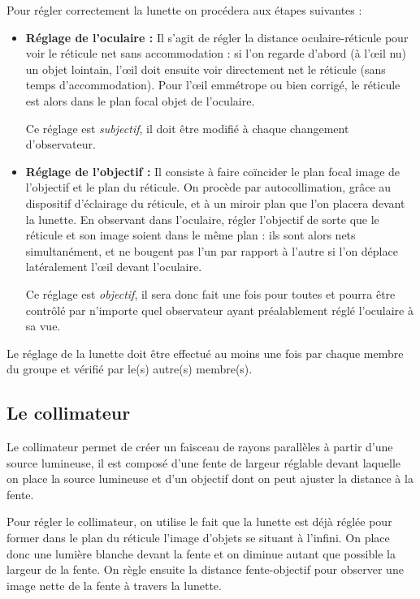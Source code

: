 \documentclass{tp}
\begin{document}
Pour régler correctement la lunette on procédera aux étapes suivantes :
\begin{itemize}
  \item \textbf{Réglage de l’oculaire : } Il s’agit de régler la distance oculaire-réticule pour voir le réticule net sans accommodation : si l’on regarde d’abord (à l’\oe{}il nu) un objet lointain, l’\oe{}il doit ensuite voir directement net le réticule (sans temps d’accommodation). Pour l’\oe{}il emmétrope ou bien corrigé, le réticule est alors dans le plan focal objet de l’oculaire.

Ce réglage est \emph{subjectif}, il doit être modifié à chaque changement d’observateur.

\item \textbf{Réglage de l’objectif : } Il consiste à faire coïncider le plan focal image de l'objectif et le plan du réticule. On procède par autocollimation, grâce au dispositif d’éclairage du réticule, et à un miroir plan que l’on placera devant la lunette. En observant dans l’oculaire, régler l’objectif de sorte que le réticule et son image soient dans le même plan : ils sont alors nets simultanément, et ne bougent pas l’un par rapport à l’autre si l’on déplace latéralement l’\oe{}il devant
l’oculaire.

Ce réglage est \emph{objectif}, il sera donc fait une fois pour toutes et pourra être contrôlé par n’importe quel observateur ayant préalablement réglé l’oculaire à sa vue.
\end{itemize}

Le réglage de la lunette doit être effectué au moins une fois par chaque membre du groupe et vérifié par le(s) autre(s) membre(s).

\subsection{Le collimateur}

Le collimateur permet de créer un faisceau de rayons parallèles à partir d'une source lumineuse, il est composé d'une fente de largeur réglable devant laquelle on place la source lumineuse et d'un objectif dont on peut ajuster la distance à la fente.

Pour régler le collimateur, on utilise le fait que la lunette est déjà réglée pour former dans le plan du réticule l'image d'objets se situant à l'infini. On place donc une lumière blanche devant la fente et on diminue autant que possible la largeur de la fente. On règle ensuite la distance fente-objectif pour observer une image nette de la fente à travers la lunette.
\end{document}
